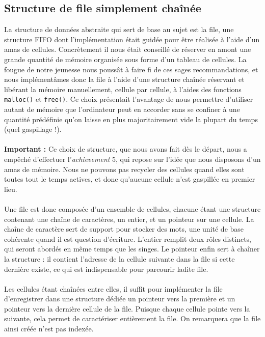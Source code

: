 \documentclass{article}
\begin{document}
\subsection{Structure de file simplement chaînée}
La structure de données abstraite qui sert de base au sujet est la file, une structure FIFO dont l'implémentation était guidée pour être réalisée à l'aide d'un amas de cellules. Concrètement il nous était conseillé de réserver en amont une grande quantité de mémoire organisée sous forme d'un tableau de cellules. La fougue de notre jeunesse nous poussât à faire fi de ces sages recommandations, et nous implémentâmes donc la file à l'aide d'une structure chaînée réservant et libérant la mémoire manuellement, cellule par cellule, à l'aides des fonctions \verb"malloc()" et \verb'free()'. Ce choix présentait l'avantage de nous permettre d'utiliser autant de mémoire que l'ordinateur peut en accorder sans se confiner à une quantité prédéfinie qu'on laisse en plus majoritairement vide la plupart du temps (quel gaspillage !).\\\\
\textbf{Important :} Ce choix de structure, que nous avons fait dès le départ, nous a empêché d'effectuer l'\emph{achievement} 5, qui repose sur l'idée que nous disposons d'un amas de mémoire. Nous ne pouvons pas recycler des cellules quand elles sont toutes tout le temps actives, et donc qu'aucune cellule n'est gaspillée en premier lieu.\\\\
Une file est donc composée d'un ensemble de cellules, chacune étant une structure contenant une chaîne de caractères, un entier, et un pointeur sur une cellule. La chaîne de caractère sert de support pour stocker des mots, une unité de base cohérente quand il est question d'écriture. L'entier remplit deux rôles distincts, qui seront abordés en même temps que les singes. Le pointeur enfin sert à chaîner la structure : il contient l'adresse de la cellule suivante dans la file si cette dernière existe, ce qui est indispensable pour parcourir ladite file.\\\\
Les cellules étant chaînées entre elles, il suffit pour implémenter la file d'enregistrer dans une structure dédiée un pointeur vers la première et un pointeur vers la dernière cellule de la file. Puisque chaque cellule pointe vers la suivante, cela permet de caractériser entièrement la file. On remarquera que la file ainsi créée n'est pas indexée.\\
\end{document}
